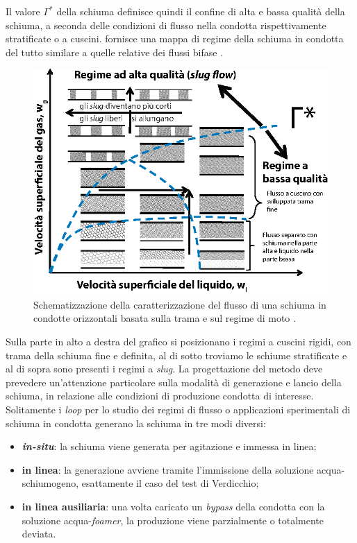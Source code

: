 Il valore \(\Gamma^{*}\) della schiuma definisce quindi il confine di alta e bassa qualità della schiuma, a seconda delle condizioni di flusso nella condotta rispettivamente stratificate o a cuscini. \textcite{gajbhiye2011characterization} fornisce una mappa di regime della schiuma in condotta del tutto similare a quelle relative dei flussi bifase .
\begin{figure}[htbp]
    \centering
    \includegraphics[width=.7\textwidth]{fig/test/foam-mappa}
    \caption{Schematizzazione della caratterizzazione del flusso di una schiuma in condotte orizzontali basata sulla trama e sul regime di moto  \parencite{gajbhiye2011characterization}.} 
    \label{fig:foam-mappa}
\end{figure}
Sulla parte in alto a destra del grafico si posizionano i regimi a cuscini rigidi, con trama della schiuma fine e definita, al di sotto troviamo le schiume stratificate e al di sopra sono presenti i regimi a \textit{slug}. 
La progettazione del metodo deve prevedere un'attenzione particolare sulla modalità di generazione e lancio della schiuma, in relazione alle condizioni di produzione condotta di interesse. Solitamente i \textit{loop} per lo studio dei regimi di flusso o applicazioni sperimentali di schiuma in condotta \parencite{karam2013foam} generano la schiuma in tre modi diversi:
\begin{itemize}
    \item \textit{\textbf{in-situ}}: la schiuma viene generata per agitazione e immessa in linea;
    \item \textbf{in linea}: la generazione avviene tramite l'immissione della soluzione acqua-schiumogeno, esattamente il caso del test di Verdicchio;
    \item \textbf{in linea ausiliaria}: una volta caricato un \textit{bypass} della condotta con la soluzione acqua-\textit{foamer}, la produzione viene parzialmente o totalmente deviata.
\end{itemize}
